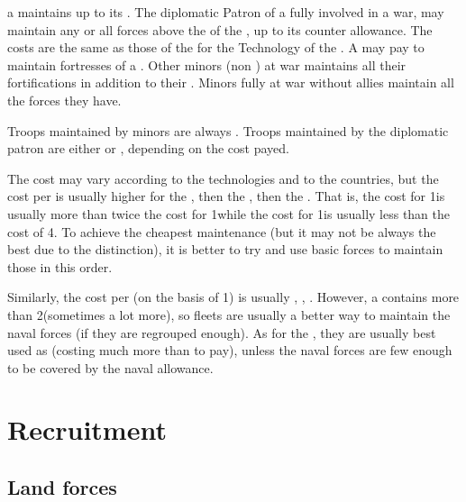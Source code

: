 \aparag[At war] a \MIN maintains up to its .
\bparag The diplomatic Patron of a \MIN fully involved in a war, may maintain
any or all forces above the  of the \MIN, up to its
counter allowance.
\bparag The costs are the same as those of the \MAJ for the Technology of the
\MIN.
\bparag A \MAJ may pay to maintain fortresses of a \VASSAL.
\bparag Other minors (non \VASSAL) at war maintains all their fortifications
in addition to their .
\bparag Minors fully at war without \MAJ allies maintain all the forces they
have.

\aparag[Moral] Troops maintained by minors are always .
\bparag Troops maintained by the diplomatic patron are either 
or , depending on the cost payed.

\begin{designnote} The cost may vary according to the
  technologies and to the countries, but the cost per \LD is usually higher
  for the \ARMY\facemoins, then the \LD, then the \ARMY\faceplus. That is, the
  cost for 1\ARMY\Facemoins is usually more than twice the cost for 1\LD while
  the cost for 1\ARMY\Faceplus is usually less than the cost of 4\LD. To
  achieve the cheapest maintenance (but it may not be always the best due to
  the  distinction), it is better to try and use basic forces
  to maintain those in this order.

  Similarly, the cost per \ND (on the basis of 1\FLEET{}\ND) is
  usually \FLEET\facemoins, \ND, \FLEET\faceplus. However, a \FLEET\facemoins
  contains more than 2\ND (sometimes a lot more), so fleets are usually a
  better way to maintain the naval forces (if they are regrouped enough). As
  for the \GD, they are usually best used as \ND (costing much more than \LD
  to pay), unless the naval forces are few enough to be covered by the naval
  allowance.
\end{designnote}





\section{Recruitment}\label{chExpenses:Recruitment}



\subsection{Land forces}


